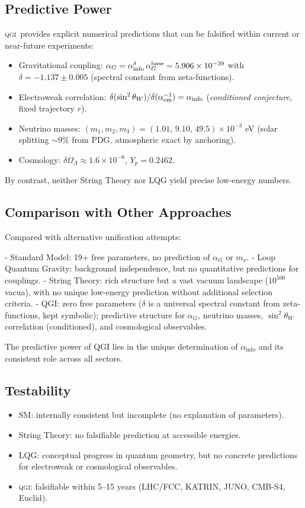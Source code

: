 \documentclass{article}
\numberwithin{equation}{section}
\theoremstyle{plain}
\theoremstyle{definition}
\theoremstyle{remark}
\newcommand{\qgi}{\textsc{qgi}}
\begin{document}
\subsection{Predictive Power}
\qgi\ provides explicit numerical predictions that can be falsified within current or near-future experiments:
\begin{itemize}
    \item Gravitational coupling: $\alpha_G = \alpha_{\rm info}^{\delta}\,\alpha_G^{\rm base} = 5.906\times 10^{-39}$ with $\delta = -1.137 \pm 0.005$ (spectral constant from zeta-functions).
    \item Electroweak correlation: $\delta(\sin^2\theta_W)/\delta(\alpha_{\rm em}^{-1}) = \alpha_{\rm info}$ (\textit{conditioned conjecture}, fixed trajectory $r$).
    \item Neutrino masses: $(m_1, m_2, m_3) = (1.01,\,9.10,\,49.5)\times 10^{-3}$ eV (solar splitting $\sim 9\%$ from PDG, atmospheric exact by anchoring).
    \item Cosmology: $\delta \Omega_\Lambda \approx 1.6\times 10^{-6}$, $Y_p = 0.2462$.
\end{itemize}
By contrast, neither String Theory nor LQG yield precise low-energy numbers.

\subsection{Comparison with Other Approaches}

Compared with alternative unification attempts:

- Standard Model: 19+ free parameters, no prediction of $\alpha_G$ or $m_\nu$.
- Loop Quantum Gravity: background independence, but no quantitative predictions for couplings.
- String Theory: rich structure but a vast vacuum landscape ($10^{500}$ vacua), 
  with no unique low-energy prediction without additional selection criteria.
- QGI: zero free parameters ($\delta$ is a universal spectral constant from zeta-functions, kept symbolic); 
  predictive structure for $\alpha_G$, neutrino masses, $\sin^2\theta_W$ correlation (conditioned), 
  and cosmological observables.

The predictive power of QGI lies in the unique determination of $\alpha_{\text{info}}$ 
and its consistent role across all sectors.


\subsection{Testability}
\begin{itemize}
    \item SM: internally consistent but incomplete (no explanation of parameters).
    \item String Theory: no falsifiable prediction at accessible energies.
    \item LQG: conceptual progress in quantum geometry, but no concrete predictions for electroweak or cosmological observables.
    \item \qgi: falsifiable within 5--15 years (LHC/FCC, KATRIN, JUNO, CMB-S4, Euclid).
\end{itemize}
\end{document}
